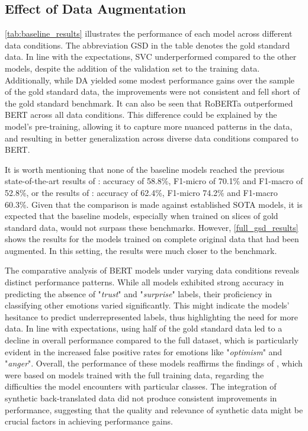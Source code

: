 \documentclass[manuscript]{clv3}
\begin{document}
\subsection{Effect of Data Augmentation}
\autoref{tab:baseline_results} illustrates the performance of each model across different data conditions. The abbreviation GSD in the table denotes the gold standard data. In line with the expectations, SVC underperformed compared to the other models, despite the addition of the validation set to the training data. Additionally, while DA yielded some modest performance gains over the sample of the gold standard data, the improvements were not consistent and fell short of the gold standard benchmark. It can also be seen that RoBERTa outperformed BERT across all data conditions. This difference could be explained by the model's pre-training, allowing it to capture more nuanced patterns in the data, and resulting in better generalization across diverse data conditions compared to BERT.

It is worth mentioning that none of the baseline models reached the previous state-of-the-art results of \citet{baziotis2018ntuaslp}: accuracy of 58.8\%, F1-micro of 70.1\% and F1-macro of 52.8\%, or the results of \citet{10.1016/j.eswa.2022.118534}: accuracy of 62.4\%, F1-micro 74.2\% and F1-macro 60.3\%. Given that the comparison is made against established SOTA models, it is expected that the baseline models, especially when trained on slices of gold standard data, would not surpass these benchmarks. However, \autoref{full_gsd_results} shows the results for the models trained on complete original data that had been augmented. In this setting, the results were much closer to the benchmark.

The comparative analysis of BERT models under varying data conditions reveals distinct performance patterns. While all models exhibited strong accuracy in predicting the absence of "\textit{trust}" and "\textit{surprise}" labels, their proficiency in classifying other emotions varied significantly. This might indicate the models' hesitance to predict underrepresented labels, thus highlighting the need for more data. In line with expectations, using half of the gold standard data led to a decline in overall performance compared to the full dataset, which is particularly evident in the increased false positive rates for emotions like "\textit{optimism}" and "\textit{anger}". Overall, the performance of these models reaffirms the findings of \citet{10.1016/j.eswa.2022.118534}, which were based on models trained with the full training data, regarding the difficulties the model encounters with particular classes. The integration of synthetic back-translated data did not produce consistent improvements in performance, suggesting that the quality and relevance of synthetic data might be crucial factors in achieving performance gains.
\end{document}

